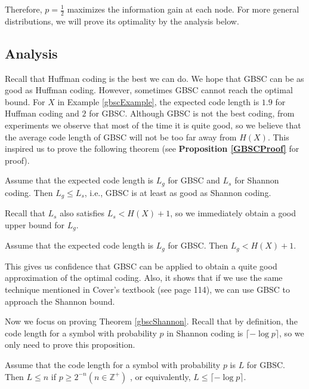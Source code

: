 Therefore, $p=\frac{1}{2}$ maximizes the information gain at each node. For more general distributions, we will prove its optimality by the analysis below.

\subsection{Analysis}

Recall that Huffman coding is the best we can do. We hope that GBSC can be as good as Huffman coding. However, sometimes GBSC cannot reach the optimal bound. For $X$ in Example \ref{gbscExample}, the expected code length is $1.9$ for Huffman coding and $2$ for GBSC. Although GBSC is not the best coding, from experiments we observe that most of the time it is quite good, so we believe that the average code length of GBSC will not be too far away from $H(X)$. This inspired us to prove the following theorem (see \textbf{Proposition \ref{GBSCProof}} for proof).

\begin{theorem}
\label{gbscShannon}
Assume that the expected code length is $L_g$ for GBSC and $L_s$ for Shannon coding. Then $L_g \le L_s$, i.e., GBSC is at least as good as Shannon coding.
\end{theorem}

Recall that $L_s$ also satisfies $L_s < H(X)+1$, so we immediately obtain a good upper bound for $L_g$.

\begin{corollary}
Assume that the expected code length is $L_g$ for GBSC. Then $L_g < H(X) + 1$.
\end{corollary}

This gives us confidence that GBSC can be applied to obtain a quite good approximation of the optimal coding. Also, it shows that if we use the same technique mentioned in Cover's textbook (see page 114), we can use GBSC to approach the Shannon bound.

Now we focus on proving Theorem \ref{gbscShannon}. Recall that by definition, the code length for a symbol with probability $p$ in Shannon coding is $\lceil -\log p \rceil$, so we only need to prove this proposition.

\begin{proposition} \label{GBSCProof}
\label{prop1}
Assume that the code length for a symbol with probability $p$ is $L$ for GBSC. Then $L \le n$ if $p \ge 2^{-n}(n \in \mathbb{Z^+})$ , or equivalently, $L \le \lceil -\log p \rceil$.
\end{proposition}


